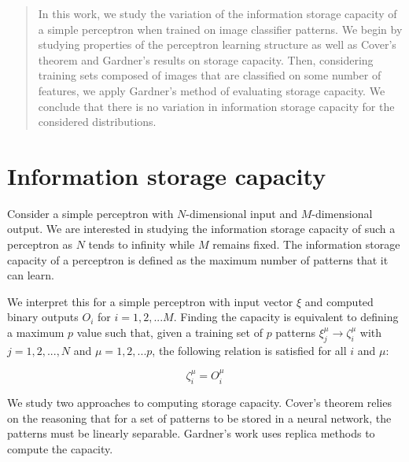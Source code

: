 \documentclass[a4paper, 11pt]{article}
\begin{document}


\tableofcontents

\newpage

\vspace{10cm}
\begin{abstract}

In this work, we study the variation of the information storage capacity of a simple perceptron when trained on image classifier patterns. We begin by studying properties of the perceptron learning structure as well as Cover's theorem and Gardner's results on storage capacity. Then, considering training sets composed of images that are classified on some number of features, we apply Gardner's method of evaluating storage capacity. We conclude that there is no variation in information storage capacity for the considered distributions.

\end{abstract}
\vfill

\newpage



\section{Information storage capacity}

Consider a simple perceptron with $N$-dimensional input and $M$-dimensional output. We are interested in studying the information storage capacity of such a perceptron as $N$ tends to infinity while $M$ remains fixed. The information storage capacity of a perceptron is defined as the maximum number of patterns that it can learn.

We interpret this for a simple perceptron with input vector $\xi$ and computed binary outputs $O_i$ for $i = 1, 2, ... M$. Finding the capacity is equivalent to defining a maximum $p$ value such that, given a training set of $p$ patterns $\xi_j^\mu \longrightarrow \zeta_i^\mu$ with $j = 1, 2, ..., N$ and $\mu = 1, 2, ... p$, the following relation is satisfied for all $i$ and $\mu$:

\begin{equation}
    \zeta_i^\mu = O_i^\mu
\end{equation}

We study two approaches to computing storage capacity. Cover's theorem \cite{introbook, orhan} relies on the reasoning that for a set of patterns to be stored in a neural network, the patterns must be linearly separable. Gardner's work \cite{introbook, gardner} uses replica methods to compute the capacity.
\end{document}
